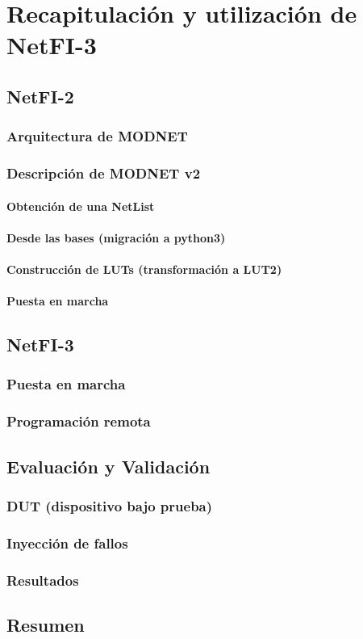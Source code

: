 \chapter{Recapitulación y utilización de NetFI-3}

\section{NetFI-2}
	\subsection{Arquitectura de MODNET}
	\subsection{Descripción de MODNET v2}
		\subsubsection{Obtención de una NetList}
		\subsubsection{Desde las bases (migración a python3)}
		\subsubsection{Construcción de LUTs (transformación a LUT2)}
		\subsubsection{Puesta en marcha}

\section{NetFI-3}
	\subsection{Puesta en marcha}
	\subsection{Programación remota}

\section{Evaluación y Validación}
	\subsection{DUT (dispositivo bajo prueba)}
	\subsection{Inyección de fallos}
	\subsection{Resultados}

\section{Resumen}